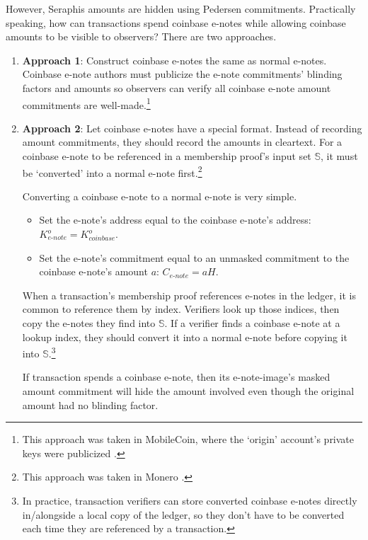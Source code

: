 However, Seraphis amounts are hidden using Pedersen commitments. Practically speaking, how can transactions spend coinbase e-notes while allowing coinbase amounts to be visible to observers? There are two approaches.

\begin{enumerate}
    \item \textbf{Approach 1}: Construct coinbase e-notes the same as normal e-notes. Coinbase e-note authors must publicize the e-note commitments' blinding factors and amounts so observers can verify all coinbase e-note amount commitments are well-made.\footnote{This approach was taken in MobileCoin, where the `origin' account's private keys were publicized \cite{mobilecoin-governance-fees-supply}.}

    \item \textbf{Approach 2}: Let coinbase e-notes have a special format. Instead of recording amount commitments, they should record the amounts in cleartext. For a coinbase e-note to be referenced in a membership proof's input set $\mathbb{S}$, it must be `converted' into a normal e-note first.\footnote{This approach was taken in Monero \cite{ztm-2}.}

    Converting a coinbase e-note to a normal e-note is very simple.
    \begin{itemize}
        \item Set the e-note's address equal to the coinbase e-note's address: $K^o_{e\textrm{-}note} = K^o_{coinbase}$.
        \item Set the e-note's commitment equal to an unmasked commitment to the coinbase e-note's amount $a$: $C_{e\textrm{-}note} = a H$.
    \end{itemize}

    When a transaction's membership proof references e-notes in the ledger, it is common to reference them by index. Verifiers look up those indices, then copy the e-notes they find into $\mathbb{S}$. If a verifier finds a coinbase e-note at a lookup index, they should convert it into a normal e-note before copying it into $\mathbb{S}$.\footnote{In practice, transaction verifiers can store converted coinbase e-notes directly in/alongside a local copy of the ledger, so they don't have to be converted each time they are referenced by a transaction.}

    If transaction spends a coinbase e-note, then its e-note-image's masked amount commitment will hide the amount involved even though the original amount had no blinding factor.
\end{enumerate}


